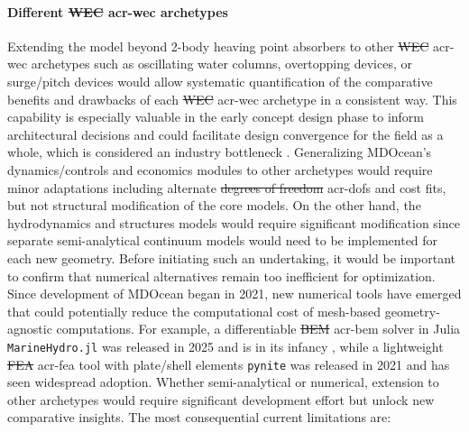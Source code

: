 \documentclass[a4paper,fleqn,colorlinks,unicode,lineno]{cas-dc} %
\makeatletter
\providecommand{\DIFdeltex}[1]{{\protect\color{red}\sout{#1}}} %
\providecommand{\DIFaddbegin}{} %
\providecommand{\DIFaddend}{} %
\providecommand{\DIFdelbegin}{} %
\providecommand{\DIFdelend}{} %
\providecommand{\DIFdel}[1]{\texorpdfstring{\DIFdeltex{#1}}{}} %
\providecommand{\DIFscaledelfig}{0.5}
\newlength{\DIFdelgraphicswidth} %
\newlength{\DIFdelgraphicsheight} %
\providecommand{\DIFaddincludegraphics}[2][]{{\color{blue}\fbox{\DIFOincludegraphics[#1]{#2}}}} %
\providecommand{\DIFdelincludegraphics}[2][]{%
\sbox{\DIFdelgraphicsbox}{\DIFOincludegraphics[#1]{#2}}%
\settoboxwidth{\DIFdelgraphicswidth}{\DIFdelgraphicsbox} %
\settoboxtotalheight{\DIFdelgraphicsheight}{\DIFdelgraphicsbox} %
\scalebox{\DIFscaledelfig}{%
\parbox[b]{\DIFdelgraphicswidth}{\usebox{\DIFdelgraphicsbox}\\[-\baselineskip] \rule{\DIFdelgraphicswidth}{0em}}\llap{\resizebox{\DIFdelgraphicswidth}{\DIFdelgraphicsheight}{%
\setlength{\unitlength}{\DIFdelgraphicswidth}%
\begin{picture}(1,1)%
\thicklines\linethickness{2pt} %
{\color[rgb]{1,0,0}\put(0,0){\framebox(1,1){}}}%
{\color[rgb]{1,0,0}\put(0,0){\line( 1,1){1}}}%
{\color[rgb]{1,0,0}\put(0,1){\line(1,-1){1}}}%
\end{picture}%
}\hspace*{3pt}}} %
} %
\DeclareRobustCommand{\DIFaddbegin}{\DIFOaddbegin \let\includegraphics\DIFaddincludegraphics} %
\DeclareRobustCommand{\DIFaddend}{\DIFOaddend \let\includegraphics\DIFOincludegraphics} %
\DeclareRobustCommand{\DIFdelbegin}{\DIFOdelbegin \let\includegraphics\DIFdelincludegraphics} %
\DeclareRobustCommand{\DIFdelend}{\DIFOaddend \let\includegraphics\DIFOincludegraphics} %
\let\sout@orig\sout %
\renewcommand{\sout}[1]{\ifmmode\text{\sout@orig{\ensuremath{#1}}}\else\sout@orig{#1}\fi} %
\makeatother
\begin{document}
    \paragraph{Different \DIFdelbegin \DIFdel{WEC }\DIFdelend \DIFaddbegin \gls{acr-wec} \DIFaddend archetypes}
    Extending the model beyond 2-body heaving point absorbers to other \DIFdelbegin \DIFdel{WEC }\DIFdelend \DIFaddbegin \gls{acr-wec} \DIFaddend archetypes such as oscillating water columns, overtopping devices, or surge/pitch devices would allow systematic quantification of the comparative benefits and drawbacks of each \DIFdelbegin \DIFdel{WEC }\DIFdelend \DIFaddbegin \gls{acr-wec} \DIFaddend archetype in a consistent way.
    This capability is especially valuable in the early concept design phase to inform architectural decisions and could facilitate design convergence for the field as a whole, which is considered an industry bottleneck \citep{caio_tackling_2019}.
    Generalizing MDOcean's dynamics/controls and economics modules to other archetypes would require minor adaptations including alternate \DIFdelbegin \DIFdel{degrees of freedom }\DIFdelend \DIFaddbegin \glspl{acr-dof} \DIFaddend and cost fits, but not structural modification of the core models.
    On the other hand, the hydrodynamics and structures models would require significant modification since separate semi-analytical continuum models would need to be implemented for each new geometry.
    Before initiating such an undertaking, it would be important to confirm that numerical alternatives remain too inefficient for optimization.
    Since development of MDOcean began in 2021, new numerical tools have emerged that could potentially reduce the computational cost of mesh-based geometry-agnostic computations.
    For example, a differentiable \DIFdelbegin \DIFdel{BEM }\DIFdelend \DIFaddbegin \gls{acr-bem} \DIFaddend solver in Julia \texttt{MarineHydro.jl} was released in 2025 and is in its infancy \citep{khanal_fully_2025}, while a lightweight \DIFdelbegin \DIFdel{FEA }\DIFdelend \DIFaddbegin \gls{acr-fea} \DIFaddend tool with plate/shell elements \texttt{pynite} was released in 2021 and has seen widespread adoption.
    Whether semi-analytical or numerical, extension to other archetypes would require significant development effort but unlock new comparative insights.
\else
    The most consequential current limitations are:
\end{document}
